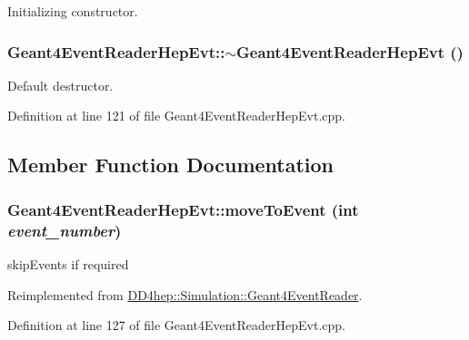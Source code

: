 Initializing constructor. \hypertarget{class_d_d4hep_1_1_simulation_1_1_geant4_event_reader_hep_evt_a76273635b29ccc9d9977327da6d6d32d}{
\subsubsection[{$\sim$Geant4EventReaderHepEvt}]{\setlength{\rightskip}{0pt plus 5cm}Geant4EventReaderHepEvt::$\sim$Geant4EventReaderHepEvt ()}}
\label{class_d_d4hep_1_1_simulation_1_1_geant4_event_reader_hep_evt_a76273635b29ccc9d9977327da6d6d32d}


Default destructor. 

Definition at line 121 of file Geant4EventReaderHepEvt.cpp.

\subsection{Member Function Documentation}
\hypertarget{class_d_d4hep_1_1_simulation_1_1_geant4_event_reader_hep_evt_a9e8bf8ad3882ab62d481c6020b9adaed}{
\subsubsection[{moveToEvent}]{ Geant4EventReaderHepEvt::moveToEvent (int {\em event\_\-number})}}
\label{class_d_d4hep_1_1_simulation_1_1_geant4_event_reader_hep_evt_a9e8bf8ad3882ab62d481c6020b9adaed}


skipEvents if required 

Reimplemented from \hyperlink{class_d_d4hep_1_1_simulation_1_1_geant4_event_reader_a0b6d2fe12ae259534cbe7a5b6e35b642}{DD4hep::Simulation::Geant4EventReader}.

Definition at line 127 of file Geant4EventReaderHepEvt.cpp.

